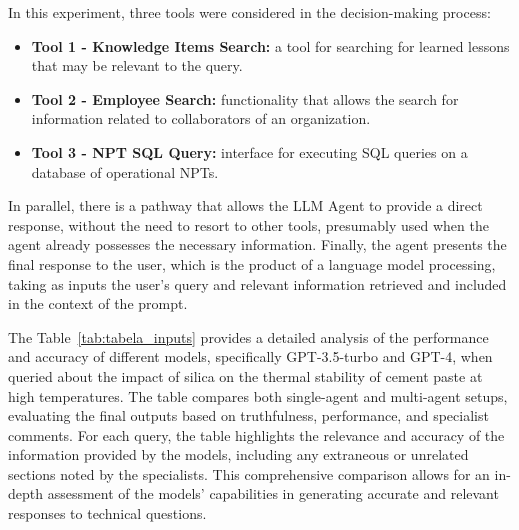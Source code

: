             In this experiment, three tools were considered in the decision-making process:

            \begin{itemize}
            
                
                \item \textbf{Tool 1 - Knowledge Items Search:} a tool for searching for learned lessons that may be relevant to the query. 
                \label{Tool1}
        
                \item \label{Tool2} \textbf{Tool 2 - Employee Search:} functionality that allows the search for information related to collaborators of an organization.
        
                \item \label{Tool3} \textbf{Tool 3 - NPT SQL Query:} interface for executing SQL queries on a database of operational NPTs.    
                
            \end{itemize}

            In parallel, there is a pathway that allows the LLM Agent to provide a direct response, without the need to resort to other tools, presumably used when the agent already possesses the necessary information. Finally, the agent presents the final response to the user, which is the product of a language model processing, taking as inputs the user's query and relevant information retrieved and included in the context of the prompt.

            The Table~\ref{tab:tabela_inputs} provides a detailed analysis of the performance and accuracy of different models, specifically GPT-3.5-turbo and GPT-4, when queried about the impact of silica on the thermal stability of cement paste at high temperatures. The table compares both single-agent and multi-agent setups, evaluating the final outputs based on truthfulness, performance, and specialist comments. For each query, the table highlights the relevance and accuracy of the information provided by the models, including any extraneous or unrelated sections noted by the specialists. This comprehensive comparison allows for an in-depth assessment of the models' capabilities in generating accurate and relevant responses to technical questions.

